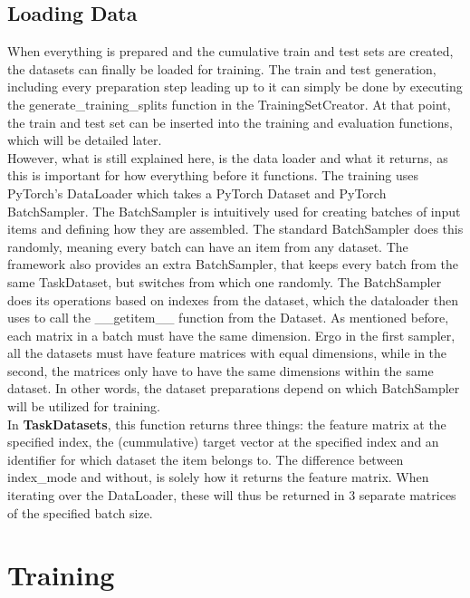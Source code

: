 \subsection{Loading Data} \label{Impl:DataLoad:Load}

When everything is prepared and the cumulative train and test sets are created, the datasets can finally be loaded for training. The train and test generation, including every preparation step leading up to it can simply be done by executing the generate\_training\_splits function in the TrainingSetCreator. At that point, the train and test set can be inserted into the training and evaluation functions, which will be detailed later. \\

However, what is still explained here, is the data loader and what it returns, as this is important for how everything before it functions. The training uses PyTorch's DataLoader which takes a PyTorch Dataset and PyTorch BatchSampler. The BatchSampler is intuitively used for creating batches of input items and defining how they are assembled. The standard BatchSampler does this randomly, meaning every batch can have an item from any dataset. The framework also provides an extra BatchSampler, that keeps every batch from the same TaskDataset, but switches from which one randomly. The BatchSampler does its operations based on indexes from the dataset, which the dataloader then uses to call the \_\_getitem\_\_ function from the Dataset. As mentioned before, each matrix in a batch must have the same dimension. Ergo in the first sampler, all the datasets must have feature matrices with equal dimensions, while in the second, the matrices only have to have the same dimensions within the same dataset. In other words, the dataset preparations depend on which BatchSampler will be utilized for training.\\

In \textbf{TaskDatasets}, this function returns three things: the feature matrix at the specified index, the (cummulative) target vector at the specified index and an identifier for which dataset the item belongs to. The difference between index\_mode and without, is solely how it returns the feature matrix. When iterating over the DataLoader, these will thus be returned in 3 separate matrices of the specified batch size. \\





\section{Training} \label{Impl:Training}

